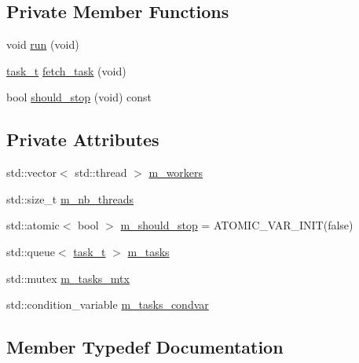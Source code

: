 \subsection*{Private Member Functions}
\begin{DoxyCompactItemize}
\item 
void \hyperlink{classtacopie_1_1utils_1_1thread__pool_a6e4ae0994faf97d0d260c1f846ff4639}{run} (void)
\item 
\hyperlink{classtacopie_1_1utils_1_1thread__pool_a8ae8886fdeaa8e5c0abad12626a47296}{task\+\_\+t} \hyperlink{classtacopie_1_1utils_1_1thread__pool_a182472a7727edc7d37d2309ccbc2dea7}{fetch\+\_\+task} (void)
\item 
bool \hyperlink{classtacopie_1_1utils_1_1thread__pool_a7a4dbfe7877e2ce8a4189e6f3d3da3a9}{should\+\_\+stop} (void) const
\end{DoxyCompactItemize}
\subsection*{Private Attributes}
\begin{DoxyCompactItemize}
\item 
std\+::vector$<$ std\+::thread $>$ \hyperlink{classtacopie_1_1utils_1_1thread__pool_a5250ed4fbe845c69e3e28cb7edf4d796}{m\+\_\+workers}
\item 
std\+::size\+\_\+t \hyperlink{classtacopie_1_1utils_1_1thread__pool_acb37b2e75b5b0ded2b3bc3174c7ba43f}{m\+\_\+nb\+\_\+threads}
\item 
std\+::atomic$<$ bool $>$ \hyperlink{classtacopie_1_1utils_1_1thread__pool_a1463eb81724978e4c694b8409528b00a}{m\+\_\+should\+\_\+stop} = A\+T\+O\+M\+I\+C\+\_\+\+V\+A\+R\+\_\+\+I\+N\+IT(false)
\item 
std\+::queue$<$ \hyperlink{classtacopie_1_1utils_1_1thread__pool_a8ae8886fdeaa8e5c0abad12626a47296}{task\+\_\+t} $>$ \hyperlink{classtacopie_1_1utils_1_1thread__pool_ad00580e9ab77e128cffaf35d80223291}{m\+\_\+tasks}
\item 
std\+::mutex \hyperlink{classtacopie_1_1utils_1_1thread__pool_aeae956282edc4d2171ee2e408cb1189f}{m\+\_\+tasks\+\_\+mtx}
\item 
std\+::condition\+\_\+variable \hyperlink{classtacopie_1_1utils_1_1thread__pool_a6f5122cc6ef6429fdb778a6e6c37216b}{m\+\_\+tasks\+\_\+condvar}
\end{DoxyCompactItemize}


\subsection{Member Typedef Documentation}
\mbox{\label{classtacopie_1_1utils_1_1thread__pool_a8ae8886fdeaa8e5c0abad12626a47296}} 
